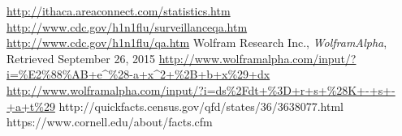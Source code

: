 \documentclass{article}
\begin{document}
\begin{thebibliography}{9}
	\url{http://ithaca.areaconnect.com/statistics.htm}
	\url{http://www.cdc.gov/h1n1flu/surveillanceqa.htm}
	\url{http://www.cdc.gov/h1n1flu/qa.htm}
	Wolfram Research Inc.,
	\emph{WolframAlpha},
	Retrieved September 26, 2015
	\url{http://www.wolframalpha.com/input/?i=\%E2\%88\%AB+e\^\%28-a+x\^2+\%2B+b+x\%29+dx}
	\url{http://www.wolframalpha.com/input/?i=ds\%2Fdt+\%3D+r+s+\%28K+-+s+-+a+t\%29}
	http://quickfacts.census.gov/qfd/states/36/3638077.html
	https://www.cornell.edu/about/facts.cfm
\end{thebibliography}








\end{document}
